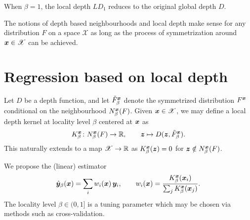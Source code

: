 \begin{remark}
    When $\beta = 1$, the local depth $LD_1$ reduces to the original global
    depth $D$.
\end{remark}

\begin{remark}
    The notions of depth based neighbourhoods and local depth make sense for
    any distribution $F$ on a space $\mathscr{X}$ as long as the process of
    symmetrization around $\bm{x} \in \mathscr{X}$ can be achieved.
\end{remark}

\section{Regression based on local depth}

\begin{definition}
    Let $D$ be a depth function, and let $\tilde{F}^{\bm{x}}_\beta$ denote the
    symmetrized distribution $F^{\bm{x}}$ conditional on the neighbourhood
    $N^{\bm{x}}_\beta(F)$.
    Given $\bm{x} \in \mathscr{X}$, we may define a local depth kernel at
    locality level $\beta$ centered at $\bm{x}$ as
    \begin{equation}
        K^{\bm{x}}_\beta\colon N^{\bm{x}}_\beta(F) \to \mathbb{R}, \qquad
        \bm{z} \mapsto D(\bm{z}, \tilde{F}^{\bm{x}}_\beta).
    \end{equation}
    This naturally extends to a map $\mathscr{X} \to \mathbb{R}$ as
    $K^{\bm{x}}_\beta(\bm{z}) = 0$ for $\bm{z} \notin N^{\bm{x}}_\beta(F)$.
\end{definition}


We propose the (linear) estimator
\begin{equation}
    \hat{\bm{y}}_\beta(\bm{x}) = \sum_i w_i(\bm{x})\, \bm{y}_i, \qquad
    w_i(\bm{x}) = \frac{K^{\bm{x}}_\beta(\bm{x}_i)}{\sum_j K^{\bm{x}}_\beta(\bm{x}_j)}.
\end{equation}
The locality level $\beta \in (0, 1]$ is a tuning parameter which may be
chosen via methods such as cross-validation.
